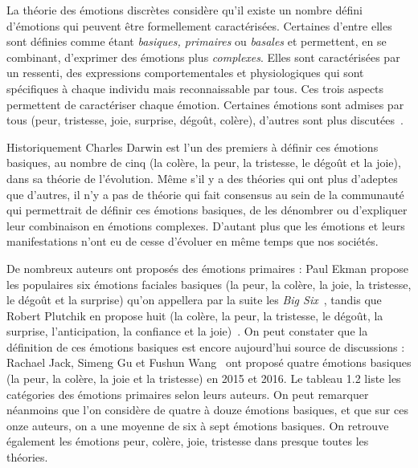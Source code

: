 La théorie des émotions discrètes considère qu'il existe un nombre défini d'émotions qui peuvent être formellement caractérisées. Certaines d'entre elles sont définies comme étant \textit{basiques, primaires} ou \textit{basales} et permettent, en se combinant, d'exprimer des émotions plus \textit{complexes}. Elles sont caractérisées par un ressenti, des expressions comportementales et physiologiques qui sont spécifiques à chaque individu mais reconnaissable par tous. Ces trois aspects permettent de caractériser chaque émotion. Certaines émotions sont admises par tous (peur, tristesse, joie, surprise, dégoût, colère), d'autres sont plus discutées~\cite{Cosnier1994}.

Historiquement Charles Darwin est l'un des premiers à définir ces émotions basiques, au nombre de cinq (la colère, la peur, la tristesse, le dégoût et la joie), dans sa théorie de l'évolution. %
Même s'il y a des théories qui ont plus d'adeptes que d'autres, il n'y a pas de théorie qui fait consensus au sein de la communauté qui permettrait de définir ces émotions basiques, de les dénombrer ou d'expliquer leur combinaison en émotions complexes. D'autant plus que les émotions et leurs manifestations n'ont eu de cesse d'évoluer en même temps que nos sociétés.



De nombreux auteurs ont proposés des émotions primaires : Paul Ekman propose les populaires six émotions faciales basiques (la peur, la colère, la joie, la tristesse, le dégoût et la surprise) qu'on appellera par la suite les \textit{Big Six}~\cite{Ekman1999}, tandis que Robert Plutchik en propose huit (la colère, la peur, la tristesse, le dégoût, la surprise, l'anticipation, la confiance et la joie)~\cite{Plutchik1980}. On peut constater que la définition de ces émotions basiques est encore aujourd'hui source de discussions : Rachael Jack, Simeng Gu et Fushun Wang~\cite{Jack2016,Gu2015,Wang2016} ont proposé quatre émotions basiques (la peur, la colère, la joie et la tristesse) en 2015 et 2016. Le tableau 1.2
 liste les catégories des émotions primaires selon leurs auteurs. On peut remarquer néanmoins que l'on considère de quatre à douze émotions basiques, et que sur ces onze auteurs, on a une moyenne de six à sept émotions basiques. On retrouve également les émotions peur, colère, joie, tristesse dans presque toutes les théories.

